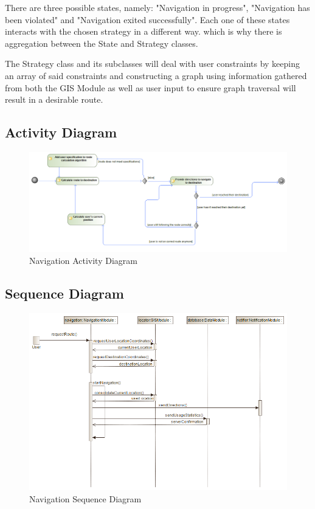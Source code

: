 		There are three possible states, namely: "Navigation in progress", "Navigation has been violated" and "Navigation exited successfully". Each one of these states interacts with the chosen strategy in a different way. which is why there is aggregation between the State and Strategy classes.
		
		The Strategy class and its subclasses will deal with user constraints by keeping an array of said constraints and constructing a graph using information gathered from both the GIS Module as well as user input to ensure graph traversal will result in a desirable route. 
	
	\subsection{Activity Diagram}
	\begin{figure}[H]
	\includegraphics[width=\linewidth]{Navigation/NavigationModuleActivityDiagram.png}
	\caption{Navigation Activity Diagram}
	\label{fig:UML2}
	\end{figure}
	
	\subsection{Sequence Diagram}
	\begin{figure}[H]
	\includegraphics[scale=0.44]{Navigation/NavigationModuleSequenceDiagram.png}
	\caption{Navigation Sequence Diagram}
	\label{fig:UML5}
	\end{figure}
	
